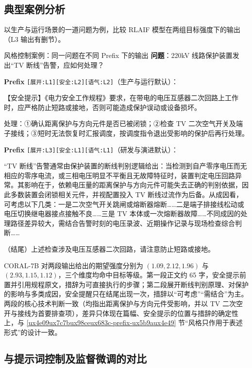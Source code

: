 \documentclass[fontset=fandol,type=master,campus=shenzhen,etitleauto=true]{hithesisbook}
\begin{document}
\subsection{典型案例分析}\label{subsec:style-case}

以生产与运行场景的一道问题为例，比较 RLAIF 模型在两组目标强度下的输出（L3 输出有删节）。

\begin{promptbox}{风格控制案例：同一问题在不同 Prefix 下的输出}
\textbf{问题}：220kV 线路保护装置发出“TV 断线”告警，应如何处理？\par\smallskip
\textbf{Prefix} \texttt{[展开:L1][安全:L2][语气:L2]}（生产与运行默认）：\par
【安全提示】《电力安全工作规程》要求，在带电的电压互感器二次回路上工作时，应严格防止短路或接地，否则可能造成保护误动或设备损坏。\par
处理：①确认距离保护与方向元件是否已被闭锁；②检查 TV 二次空气开关及端子接线；③短时无法恢复时汇报调度，按调度指令退出受影响的保护后再行处理。\par\smallskip
\textbf{Prefix} \texttt{[展开:L3][安全:L1][语气:L1]}（研发与演进默认）：\par
“TV 断线”告警通常由保护装置的断线判别逻辑给出：当检测到自产零序电压而无相应的零序电流，或三相电压明显不平衡且无故障特征时，装置判定电压回路异常。其影响在于，依赖电压量的距离保护与方向元件可能失去正确的判别依据，因此多数装置会闭锁相关元件，并视配置投入 TV 断线过流作为后备。从成因看，可考虑以下几类：一是二次空气开关跳闸或熔断器熔断……二是端子排接线松动或电压切换继电器接点接触不良……三是 TV 本体或一次熔断器故障……不同成因的处理路径差异较大，需结合告警时刻的电压录波、近期操作记录与现场检查综合判断……\par
（结尾）上述检查涉及电压互感器二次回路，请注意防止短路或接地。
\end{promptbox}

CORAL-7B 对两段输出给出的期望强度分别为 $(1.09, 2.12, 1.96)$ 与 $(2.93, 1.15, 1.12)$，三个维度均命中目标等级。第一段正文约 65 字，安全提示前置并引用规程原文，措辞为可直接执行的步骤；第二段展开断线判别原理、对保护的影响与多类成因，安全提醒只在结尾出现一次，措辞以“可考虑”“需结合”为主。两段的核心技术判断一致（均指出距离保护与方向元件受影响，并以 TV 二次空开与接线为首要排查项），差异只体现在篇幅、安全提示的位置与措辞的确定性上，与 \ref{ux4e09ux7c7bux98ceux683c-prefix-ux5b9aux4e49} 节“风格只作用于表述形式”的设计一致。

\subsection{与提示词控制及监督微调的对比}\label{subsec:prompt-baseline}
\end{document}
